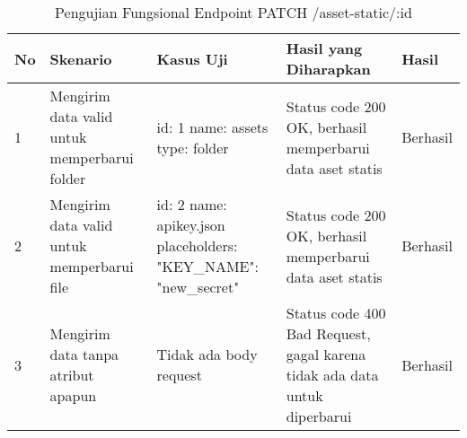 \begin{table}[H]
    \centering
    \begin{tabular}{|p{0.5cm}|p{3cm}|p{5cm}|p{5cm}|p{1.5cm}|}
        \hline
        \rowcolor[HTML]{DAE8FC} 
        \textbf{No} & \textbf{Skenario} & \textbf{Kasus Uji} & \textbf{Hasil yang Diharapkan} & \textbf{Hasil} \\ \hline
        1 & Mengirim data valid untuk memperbarui folder & 
        id: 1 \newline name: assets \newline type: folder & 
        Status code 200 OK, berhasil memperbarui data aset statis & 
        Berhasil \\ \hline
        2 & Mengirim data valid untuk memperbarui file & 
        id: 2 \newline name: apikey.json \newline placeholders: {"KEY\_NAME": "new\_secret"} & 
        Status code 200 OK, berhasil memperbarui data aset statis & 
        Berhasil \\ \hline
        3 & Mengirim data tanpa atribut apapun & 
        Tidak ada body request & 
        Status code 400 Bad Request, gagal karena tidak ada data untuk diperbarui & 
        Berhasil \\ \hline
    \end{tabular}
    \caption{Pengujian Fungsional Endpoint PATCH /asset-static/:id}
    \label{tab:asset_static_patch_testing}
\end{table}
